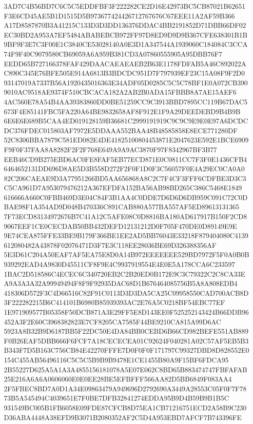\documentclass[UTF8,fontset=fandol,zihao=-4,a4paper]{ctexart}
\begin{document}
{{3AD7C4B56BD7C6C5C5EDDFBF3F222282CE2D16E42973BC5CB87021B62651F3E6CD45AE5B1D1515D5B973677424426712767676C67EEE11A2AF59B366
A17D8587870B3A41215C133D3D3DD136376DDAC4BB2191852D71DBB66DF02EC30BD2A953A7EF5484ABABEBCB972FF97D8ED9D9D9B367CFE638301B1B
9BF9F3E7C3F00E1C3840CE53028140A0E3D1A347544A1939060C184084C3CCA74F9F40C9079580CB69059A6A959B381CD3A07860555905A95DBB76F7
EEDD65B727166378FAF429DAACAEAEAEB2B63E1178FDFAB5A46C892022AC890C345E76BFE505E914A6813B3BDCDC951D7F797939EF23C15A08F9F2D0
93147019A7337B56A1920435016363E34ADF05D0285C5C5C78BF1E0A072CB3909010AC9518AE9374F510CBCACA182A2AB2B0ADA15FBBB8A7AE15AEF6
4AC560E78A54B4AA39383860DD0BE51259CC9C3913BBD7895CC119B67DAC5673F4E85141FBC5FA220A64BE9832658AF8F912E1F9A29DEEDEBD9B4B9B
6E6E6E689B5CAA4ED019128159B36681C2999191919C9C9C9E9E0E97A6DCDCDC376FDEC015803AF7972E5DDAAA552BAA48B48585858E8ECE771280DF
52C8306BBA7879C581ED082E4DE41825100804453871E2047623E592E1BCE6909F9F0F37FAA8A8282F2F2F768E649A9A9AC3870F97F8342967BF3B77
EEB46CD9B275EBD6AC0FE8FAF5EB77ECD871E0C0811CC7F3F0E1436CFB46464652131DD696D8AE5D3B558D272F2F0F1D0F3C56057F0E4A29EC0CA0A0
82C206CAEAE9D3A77951266BD5AA656868A8C2C7F4CF3FFF6CDFBE3D3C3C5CA961D7A953079476212A367EFDFA152BA56AB98BD265C386C5468E1849
616666A660C0FBB469D3E04C84F3B1AA4C0DDE7D6D6D6DB959C091C72C0DBAE98F1A354AD9D048B470336C891CAB880A577BA557AF5ED89613131365
7F73ECD83134972676B7C41A12C5AFE08C0D8816BA180AD617917B150F2CD89067EEF1CE0CECDAB50BB432DEFD12131212D0F705F470DE0D89149E9E
9E74CEA875FFE33BE9B179F366BE1EE2AD5BB76043E33218F879404080C4139612080482A43878F02076471D3F7E3C118EE28036BE69D326388356AF
5E3D61C204A50EAF7AF5EA75E8D0A14B972EEEEEEE529BD7972F5F0A0B0B939292EAD4A9830D45511CF8F9E4C9937919554E4E0E5A178CCA6C233597
1BAC2D518586C4ECEC6C340720EB2C2B20ED0B172E9C3C79322C2C8CA33EA9A3A3A32A99949494F8F9F92935DAC68D1B676464085756B5A8A808EDB4
418306D572F3C4D66516C82F91C0113D3D3DA5CA25C09958550CAD700ACB8D3F222282215B6C414101B6980B85939393AC2E76A5C0218BF54EBC77EF
1E971909577B05358F50DCB871A3E29FF5E8D143EE0F525252143424B66DDB96452A3F2E60C3968382823E7CF8205CA7585F44BE9210CA815A99D6AC
5923A8B32B9D6187BB5F22DC50E4DA84BB0CEBD6B66CD982BEFE551AB889F0B26EAF5DBB666F6FCF7A18CECECEA01C92624F040281A02C57AF5EB5B3
B343F7D5B163C756CB84E42270FFFE7D0F0F0F171797C99327DBD8D828552E0154C455AB56496116C5C5C5B9B9B9478E1CE1455B80A9F15BF6FDCA95
2B55227D625A5A1A3A4855156181078A5E07E062C8BD65B883474747FBFAFAB25E216A6A6A0606060E0E0EE28BE5EFBFFF566AA82D5BB6849F083AA4
2F5FBEC8BD7A0D1A34E09863479A949696D2792690A3449A28553C05F0F7F7873B5A545494C4039651E7F0BE7DFB32841274EDDA95B9D4B59B9B1B5C
931549BC005B1FB6058E09FDE87CFCB8D75EA1CB71216751ECD2A58B9C230D36ABA4448A38EFD9B3071B2080352AF2C5D4A953EBD7AFCF7B743396FE
}}
\end{document}
